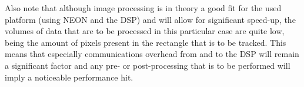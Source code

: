 \documentclass[final]{article}
\begin{document}
Also note that although image processing is in theory a good fit for the used platform (using NEON and the DSP) and will allow for significant speed-up, the volumes of data that are to be processed in this particular case are quite low, being the amount of pixels present in the rectangle that is to be tracked. This means that especially communications overhead from and to the DSP will remain a significant factor and any pre- or post-processing that is to be performed will imply a noticeable performance hit.
\end{document}
